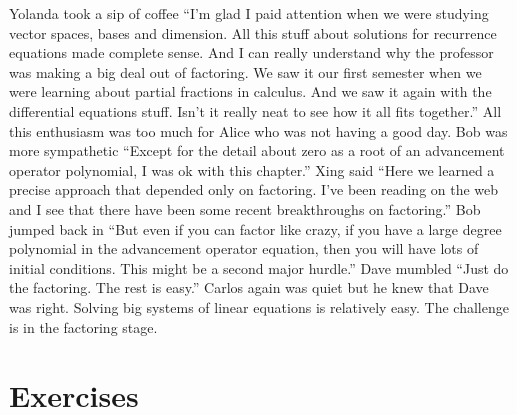 Yolanda took a sip of coffee ``I'm glad I paid attention
when we were studying vector spaces, bases and dimension.
All this stuff about solutions for recurrence equations
made complete sense.   And I can really understand why
the professor was making a big deal out of factoring.
We saw it our first semester when we were learning about
partial fractions in calculus.  And we saw it again with the differential
equations stuff.  Isn't it really neat to see how it all
fits together.''  All this enthusiasm was too much for Alice who 
was not having a good day.  Bob was more sympathetic ``Except for
the detail about zero as a root of an advancement operator
polynomial, I was ok with this chapter.'' Xing said ``Here
we learned a precise approach that depended only on factoring.
I've been reading on the web and I see that there have
been some recent breakthroughs on factoring.''  Bob jumped
back in ``But even if you can factor like crazy, if you
have a large degree polynomial in the advancement operator
equation, then you will have lots of initial conditions.
This might be a second major hurdle.'' Dave mumbled ``Just
do the factoring. The rest is easy.''  Carlos again was
quiet but he knew that Dave was right.  Solving big
systems of linear equations is relatively easy. The
challenge is in the factoring stage.

\section{Exercises}\label{s:recurrence:exercises}

